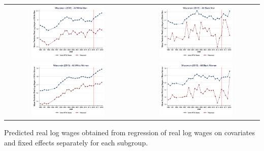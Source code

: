 \documentclass[11pt]{article}
\begin{document}
{\pagebreak
\begin{landscape}
\begin{table}[h!]
    \centering
    \label{fig:pta_wi}
    \begin{tabular}{c c}
          \includegraphics[width = 0.6\textwidth, keepaspectratio]{figures/pta/fin_wm_wi.png} & \includegraphics[width = 0.6\textwidth, keepaspectratio]{figures/pta/fin_bm_wi.png} \\
          \includegraphics[width = 0.6\textwidth, keepaspectratio]{figures/pta/fin_wf_wi.png} & \includegraphics[width = 0.6\textwidth, keepaspectratio]{figures/pta/fin_bf_wi.png}
    \end{tabular}
\end{table}
\footnotesize{Predicted real log wages obtained from regression of real log wages on covariates and fixed effects separately for each subgroup.}
\end{landscape}

}
\end{document}
